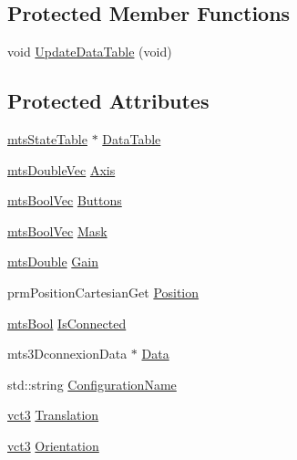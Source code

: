 \subsection*{Protected Member Functions}
\begin{DoxyCompactItemize}
\item 
void \hyperlink{classmts3_dconnexion_a58d9df19ed8b33d6daadc588ceffacb3}{Update\+Data\+Table} (void)
\end{DoxyCompactItemize}
\subsection*{Protected Attributes}
\begin{DoxyCompactItemize}
\item 
\hyperlink{classmts_state_table}{mts\+State\+Table} $\ast$ \hyperlink{classmts3_dconnexion_a297dbc803c7b296a06d90b59d6c2cd3e}{Data\+Table}
\item 
\hyperlink{mts_vector_8h_af69167a5dc2ad33eb93965b9387d8403}{mts\+Double\+Vec} \hyperlink{classmts3_dconnexion_aef658870f656a1ccb93a065d74d74e4b}{Axis}
\item 
\hyperlink{mts_vector_8h_a11c0cbf286b972226b08510c6ba92e67}{mts\+Bool\+Vec} \hyperlink{classmts3_dconnexion_a8fc19fc124985d015c53b9580ca7355f}{Buttons}
\item 
\hyperlink{mts_vector_8h_a11c0cbf286b972226b08510c6ba92e67}{mts\+Bool\+Vec} \hyperlink{classmts3_dconnexion_a9aa79512dbed22a9c69d56ec7e757791}{Mask}
\item 
\hyperlink{mts_generic_object_proxy_8h_a31e76b0190a8d3f9838626cd7b47bd75}{mts\+Double} \hyperlink{classmts3_dconnexion_a790ed1fc6b5a64b4a1d022a541c3ae90}{Gain}
\item 
prm\+Position\+Cartesian\+Get \hyperlink{classmts3_dconnexion_a18477fb46941bead7c9c998aa4f64cae}{Position}
\item 
\hyperlink{mts_generic_object_proxy_8h_ae2e26261f1874d4aa4ee374ece7646bd}{mts\+Bool} \hyperlink{classmts3_dconnexion_a7242b5dd56fed7c290e054fe129e2c00}{Is\+Connected}
\item 
mts3\+Dconnexion\+Data $\ast$ \hyperlink{classmts3_dconnexion_af6ca74b9b8dd0a73f56cc7d0eab06fc4}{Data}
\item 
std\+::string \hyperlink{classmts3_dconnexion_af68f59f690ccf2fd198b90eedae0e769}{Configuration\+Name}
\item 
\hyperlink{vct_fixed_size_vector_types_8h_a3af82acdbf4eeb73c551909240b106ea}{vct3} \hyperlink{classmts3_dconnexion_a8e84db133cf3e6f2624b231a05e049bf}{Translation}
\item 
\hyperlink{vct_fixed_size_vector_types_8h_a3af82acdbf4eeb73c551909240b106ea}{vct3} \hyperlink{classmts3_dconnexion_afff4aa6e11a99251eaf021e9bba2047c}{Orientation}
\end{DoxyCompactItemize}
